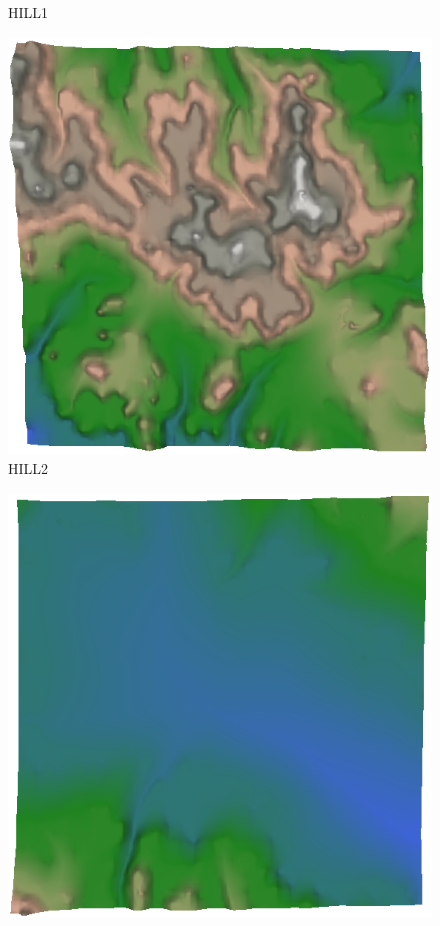 \begin{figure}[t]
\begin{minipage}[b]{0.3\linewidth}
\begin{center}
HILL1
\end{center}
\end{minipage}
%
\begin{minipage}[b]{0.3\linewidth}
\begin{center}
\includegraphics[width=\linewidth]{images/hill2_normalized.png} \\
HILL2
\end{center}
\end{minipage}
%
\begin{minipage}[b]{0.3\linewidth}
\begin{center}
\includegraphics[width=\linewidth]{images/hill3_normalized.png} \\

\end{center}
\end{minipage}
\end{figure}
